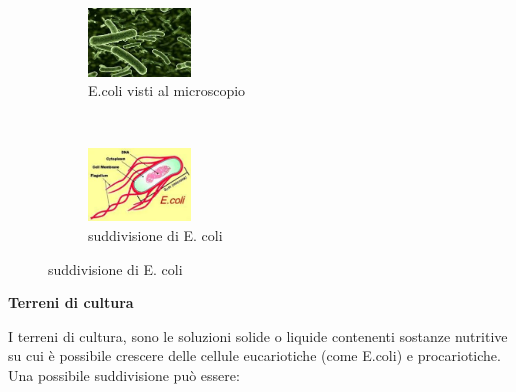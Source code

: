 \begin{figure}[H]
  \centering

  \begin{subfigure}[b]{1\textwidth}
    \centering
    \includegraphics[width=0.3\textwidth]{./immagini/e_coli.jpeg}
    \caption{E.coli visti al microscopio}

  \end{subfigure}

  ~

  \begin{subfigure}[b]{1\textwidth}
    \centering
    \includegraphics[width=0.3\textwidth]{./immagini/e_coli1.jpeg}
    \caption{suddivisione di E. coli}

  \end{subfigure}

  \label{e_coli}

\end{figure}

\textbf{Terreni di cultura}
\vspace{0.3cm}

I terreni di cultura, sono le soluzioni solide o liquide contenenti sostanze nutritive su cui è possibile crescere delle cellule eucariotiche (come E.coli) e procariotiche.
Una possibile suddivisione può essere:

